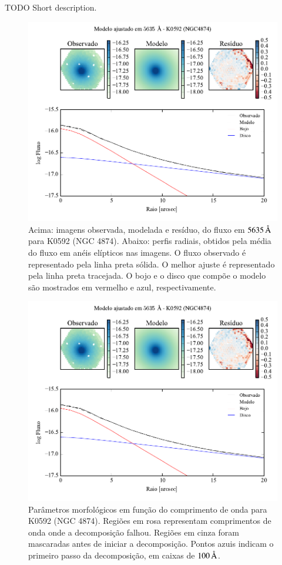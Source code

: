 TODO Short description.

\begin{figure}
	\includegraphics[page=1]{figuras-decomp/K0592_sample006a}
	\caption[Ajuste morfológico em $5635\,\angstrom$ de K0592 (NGC 4874)]
	{Acima: imagens observada, modelada e resíduo, do fluxo em $5635\,\angstrom$
	para K0592 (NGC 4874). Abaixo: perfis radiais, obtidos pela média do fluxo em
	anéis elípticos nas imagens. O fluxo observado é representado pela linha preta
	sólida. O melhor ajuste é representado pela linha preta tracejada. O bojo e o
	disco que compõe o modelo são mostrados em vermelho e azul, respectivamente.}
	\label{fig:decompRadprof:K0592}
\end{figure}

\begin{figure}
	\includegraphics[page=2]{figuras-decomp/K0592_sample006a}
	\caption[Parâmetros morfológicos em função do comprimento de onda de K0592
	(NGC 4874)]
	{Parâmetros morfológicos em função do comprimento de onda para
	K0592 (NGC 4874). Regiões em rosa representam comprimentos de onda onde a
	decomposição falhou. Regiões em cinza foram mascaradas antes de iniciar a
	decomposição. Pontos azuis indicam o primeiro passo da decomposição, em caixas
	de $100\,\text{\normalfont\AA}$.}
	\label{fig:decompParams:K0592}
\end{figure}

